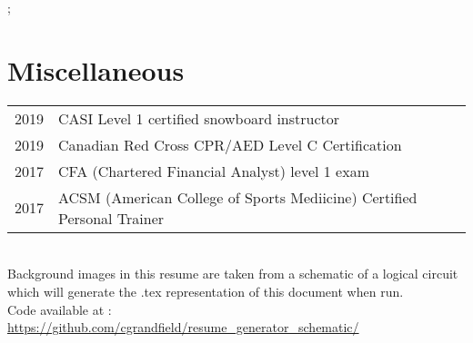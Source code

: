\documentclass[a4paper,10pt]{article}
\begin{document}
\newpage
{};

\hspace{-0.75cm}
\makebox[0pt][s]{
  \raisebox{-\totalheight}[0pt][0pt]{
``  \begin{tikzpicture}
	\draw[draw=white,fill=white, opacity=0.9] (0,0) rectangle ++(\paperwidth-2cm,6cm);
    \end{tikzpicture}
  }
}

\section{Miscellaneous}

\begin{tabular}{rl}
2019 & CASI Level 1 certified snowboard instructor \\
2019 & Canadian Red Cross CPR/AED Level C Certification \\
2017 & CFA (Chartered Financial Analyst) level 1 exam \\
2017 & ACSM (American College of Sports Mediicine) Certified Personal Trainer \\
\end{tabular} \\

Background images in this resume are taken from a schematic of a logical circuit which will generate the .tex representation of this document when run. \\
Code available at :   \href{https://github.com/cgrandfield/resume_generator_schematic/}{https://github.com/cgrandfield/resume\_generator\_schematic/} \\
\end{document}
